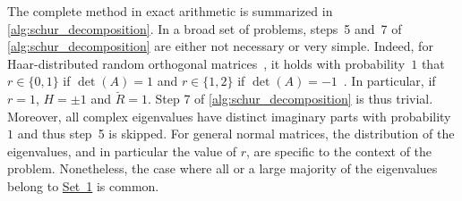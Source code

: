 \documentclass[10pt,twoside,dvipsnames]{siamart1116}
\numberwithin{algorithm}{section}
\numberwithin{equation}{section}
\newcommand{\wordref}[2]{\hyperlink{#1}{#2}}
\begin{document}
The complete method in exact arithmetic is summarized in \cref{alg:schur_decomposition}. In a broad set of problems, steps~5 and~7 of \cref{alg:schur_decomposition} are either not necessary or very simple. Indeed, for Haar-distributed random orthogonal matrices~\cite{Anderson87, Stewart80}, it holds with probability~$1$ that $r\in\{0,1\}$ if $\det(A)=1$ and $r\in\{1,2\}$ if $\det(A)=-1$~\cite{Fasi21}. In particular, if $r=1$, $H=\pm 1$ and $\breve{R}=1$. Step 7 of \cref{alg:schur_decomposition} is thus trivial. Moreover, all complex eigenvalues have distinct imaginary parts with probability $1$ and thus step~5 is skipped. For general normal matrices, the distribution of the eigenvalues, and in particular the value of $r$, are specific to the context of the problem. Nonetheless, the case where all or a large majority of the eigenvalues belong to \wordref{set1}{Set~1} is common.
\end{document}
